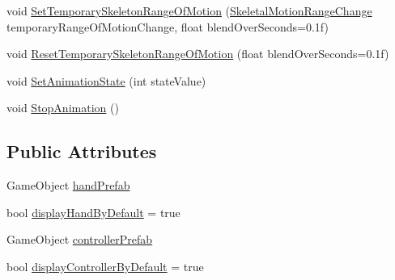 \begin{DoxyCompactItemize}
\item 
void \mbox{\hyperlink{class_valve_1_1_v_r_1_1_interaction_system_1_1_render_model_a76c76fbfa2a70f42e2587b9afd759043}{Set\+Temporary\+Skeleton\+Range\+Of\+Motion}} (\mbox{\hyperlink{namespace_valve_1_1_v_r_aabb506007a41244de5c315ff5519439f}{Skeletal\+Motion\+Range\+Change}} temporary\+Range\+Of\+Motion\+Change, float blend\+Over\+Seconds=0.\+1f)
\item 
void \mbox{\hyperlink{class_valve_1_1_v_r_1_1_interaction_system_1_1_render_model_a9214a563b09785cf98bde55caf66290e}{Reset\+Temporary\+Skeleton\+Range\+Of\+Motion}} (float blend\+Over\+Seconds=0.\+1f)
\item 
void \mbox{\hyperlink{class_valve_1_1_v_r_1_1_interaction_system_1_1_render_model_ae9e1a21abc8335c8d640fae89c6e31a8}{Set\+Animation\+State}} (int state\+Value)
\item 
void \mbox{\hyperlink{class_valve_1_1_v_r_1_1_interaction_system_1_1_render_model_a97dfb72012e93d527f53bac29e4d6510}{Stop\+Animation}} ()
\end{DoxyCompactItemize}
\subsection*{Public Attributes}
\begin{DoxyCompactItemize}
\item 
Game\+Object \mbox{\hyperlink{class_valve_1_1_v_r_1_1_interaction_system_1_1_render_model_a7e802a36ee924fa57ec4f550209dfd38}{hand\+Prefab}}
\item 
bool \mbox{\hyperlink{class_valve_1_1_v_r_1_1_interaction_system_1_1_render_model_a895f998aca319bb07a25b2d2d1864c76}{display\+Hand\+By\+Default}} = true
\item 
Game\+Object \mbox{\hyperlink{class_valve_1_1_v_r_1_1_interaction_system_1_1_render_model_afb2a66d22dc531dd0aa8ca9c515374e9}{controller\+Prefab}}
\item 
bool \mbox{\hyperlink{class_valve_1_1_v_r_1_1_interaction_system_1_1_render_model_a2cd9f0a9038db17f2d8b82c817d5c20e}{display\+Controller\+By\+Default}} = true
\end{DoxyCompactItemize}
